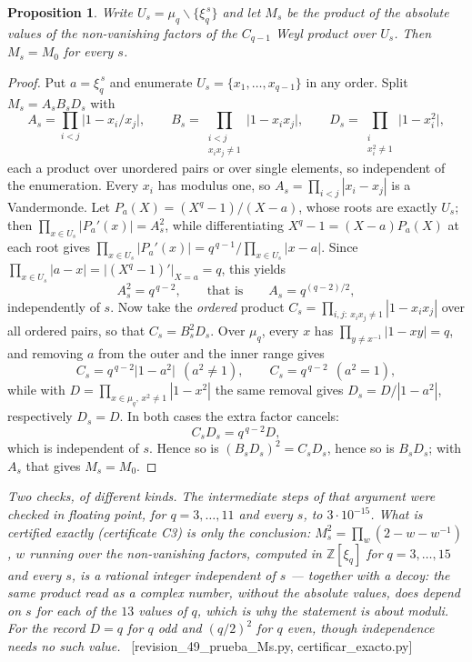 \documentclass[11pt,a4paper]{article}
\newtheorem{proposition}[theorem]{Proposition}
\theoremstyle{definition}
\newcommand{\ZZ}{\mathbb{Z}}
\newcommand{\ver}[1]{\unskip\penalty0\ \textcolor{azul}{\small\textsf{[#1]}}}
\begin{document}
\begin{proposition}\label{prop:Ms}
Write $U_s=\mu_q\smallsetminus\{\xi_q^{\,s}\}$ and let $M_s$ be the product of the \emph{absolute
values} of the non-vanishing factors of the $C_{q-1}$ Weyl product over $U_s$. Then $M_s=M_0$ for
every $s$.
\end{proposition}

\begin{proof}
Put $a=\xi_q^{\,s}$ and enumerate $U_s=\{x_1,\dots,x_{q-1}\}$ in any order. Split
$M_s=A_sB_sD_s$ with
\[
A_s=\prod_{i<j}\big|1-x_i/x_j\big|,\qquad
B_s=\prod_{\substack{i<j\\ x_ix_j\neq1}}\big|1-x_ix_j\big|,\qquad
D_s=\prod_{\substack{i\\ x_i^2\neq1}}\big|1-x_i^2\big| ,
\]
each a product over unordered pairs or over single elements, so independent of the enumeration.
Every $x_i$ has modulus one, so $A_s=\prod_{i<j}|x_i-x_j|$ is a Vandermonde. Let $P_a(X)=(X^q-1)/(X-a)$,
whose roots are exactly $U_s$; then $\prod_{x\in U_s}|P_a'(x)|=A_s^2$, while differentiating
$X^q-1=(X-a)P_a(X)$ at each root gives
$\prod_{x\in U_s}|P_a'(x)|=q^{\,q-1}\big/\prod_{x\in U_s}|x-a|$. Since
$\prod_{x\in U_s}|a-x|=\big|(X^q-1)'\big|_{X=a}=q$, this yields
\[
A_s^2=q^{\,q-2},\qquad\text{that is}\qquad A_s=q^{(q-2)/2},
\]
independently of $s$. Now take the \emph{ordered} product
$C_s=\prod_{i,j:\ x_ix_j\neq1}|1-x_ix_j|$ over all ordered pairs, so that $C_s=B_s^2D_s$. Over $\mu_q$, every $x$ has
$\prod_{y\neq x^{-1}}|1-xy|=q$, and removing $a$ from the outer and the inner range gives
\[
C_s=q^{\,q-2}\big|1-a^2\big|\ \ (a^2\neq1),\qquad C_s=q^{\,q-2}\ \ (a^2=1),
\]
while with $D=\prod_{x\in\mu_q,\,x^2\neq1}|1-x^2|$ the same removal gives $D_s=D/|1-a^2|$,
respectively $D_s=D$. In both cases the extra factor cancels:
\[
C_sD_s=q^{\,q-2}D ,
\]
which is independent of $s$. Hence so is $(B_sD_s)^2=C_sD_s$, hence so is $B_sD_s$; with $A_s$ that
gives $M_s=M_0$.
\end{proof}

\noindent \emph{Two checks, of different kinds. The intermediate steps of that argument were checked in
floating point, for $q=3,\dots,11$ and every $s$, to $3\cdot10^{-15}$. What is certified exactly
(certificate C3) is only the conclusion: $M_s^2=\prod_w(2-w-w^{-1})$, $w$ running over the
non-vanishing factors, computed in $\ZZ[\xi_q]$ for $q=3,\dots,15$ and every $s$, is a rational
integer independent of $s$ --- together with a decoy: the same product read as a complex number,
without the absolute values, does depend on $s$ for each of the $13$ values of $q$, which is why the
statement is about moduli.
For the record $D=q$ for $q$ odd and $(q/2)^2$ for $q$ even, though independence needs no such
value.} \ver{revision\_49\_prueba\_Ms.py, certificar\_exacto.py}
\end{document}

